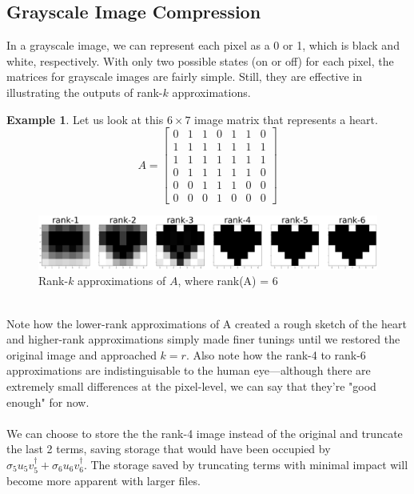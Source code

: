 \documentclass[12pt, reqno]{amsart}
\theoremstyle{definition}
\newtheorem{example}[theorem]{Example}
\theoremstyle{remark}
\numberwithin{equation}{section}
\begin{document}
\subsection{Grayscale Image Compression}
In a grayscale image, we can represent each pixel as a 0 or 1, which is black and white, respectively. With only two possible states (on or off) for each pixel, the matrices for grayscale images are fairly simple. Still, they are  effective in illustrating the outputs of rank-$k$ approximations. 
\begin{example}
    Let us look at this $6 \times 7$ image matrix that represents a heart.
    \begin{equation}
        A = \begin{bmatrix}
            0 & 1 & 1 & 0 & 1 & 1 & 0 \\
            1 & 1 & 1 & 1 & 1 & 1 & 1 \\
            1 & 1 & 1 & 1 & 1 & 1 & 1 \\
            0 & 1 & 1 & 1 & 1 & 1 & 0 \\
            0 & 0 & 1 & 1 & 1 & 0 & 0 \\
            0 & 0 & 0 & 1 & 0 & 0 & 0
        \end{bmatrix}
    \end{equation}
    \begin{figure}[h]
        \centering
        \includegraphics[width=\linewidth]{img/grayscaleheart.png}
        \caption{Rank-$k$ approximations of $A$, where rank(A) = 6}
        \label{fig:heartgrayscale}
    \end{figure}\\
    Note how the lower-rank approximations of A created a rough sketch of the heart and higher-rank approximations simply made finer tunings until we restored the original image and approached $k = r$. Also note how the rank-4 to rank-6 approximations are indistinguisable to the human eye—although there are extremely small differences at the pixel-level, we can say that they're "good enough" for now.\\\\
    We can choose to store the the rank-4 image instead of the original and truncate the last 2 terms, saving storage that would have been occupied by $\sigma_5 u_5 v_5^\dagger + \sigma_6 u_6 v_6^\dagger$. The storage saved by truncating terms with minimal impact will become more apparent with larger files.
\end{example}
\end{document}
